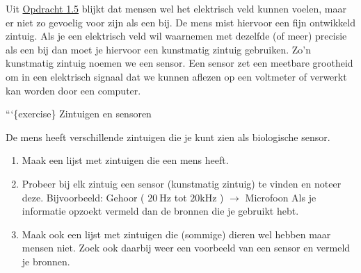 Uit \href{ex1.5}{Opdracht 1.5} blijkt dat mensen wel het elektrisch veld
kunnen voelen, maar er niet zo gevoelig voor zijn als een bij. De mens
mist hiervoor een fijn ontwikkeld zintuig. Als je een elektrisch veld
wil waarnemen met dezelfde (of meer) precisie als een bij dan moet je
hiervoor een kunstmatig zintuig gebruiken. Zo'n kunstmatig zintuig
noemen we een sensor. Een sensor zet een meetbare grootheid om in een
elektrisch signaal dat we kunnen aflezen op een voltmeter of verwerkt
kan worden door een computer.

```\{exercise\} Zintuigen en sensoren

De mens heeft verschillende zintuigen die je kunt zien als biologische
sensor.

\begin{enumerate}
\def\labelenumi{\alph{enumi})}
\item
  Maak een lijst met zintuigen die een mens heeft.
\item
  Probeer bij elk zintuig een sensor (kunstmatig zintuig) te vinden en
  noteer deze. Bijvoorbeeld: Gehoor ( \(20 \mathrm{~Hz}\) tot
  \(20 \mathrm{kHz}\) ) \(\rightarrow\) Microfoon Als je informatie
  opzoekt vermeld dan de bronnen die je gebruikt hebt.
\item
  Maak ook een lijst met zintuigen die (sommige) dieren wel hebben maar
  mensen niet. Zoek ook daarbij weer een voorbeeld van een sensor en
  vermeld je bronnen.
\end{enumerate}


